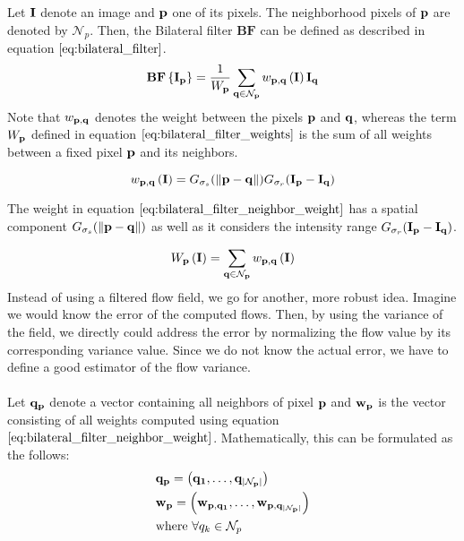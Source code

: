 Let $\bf{I}$ denote an image and $\bf{p}$ one of its pixels. The neighborhood pixels of $\bf{p}$ are denoted by $\mathcal{N}_p$. Then, the Bilateral filter $\textbf{BF}$ can be defined as described in equation $\ref{eq:bilateral_filter}$.
\begin{equation}
	\textbf{BF} \left\{ \bf{I}_{\bf{p}} \right\} = \frac{1}{W_{\bf{p}}} \sum_{\bf{q} \in \mathcal{N}_p} w_{\bf{p}, \bf{q}} \left( \bf{I} \right) \bf{I}_{\bf{q}}
\label{eq:bilateral_filter}
\end{equation}
Note that $w_{\bf{p}, \bf{q}}$ denotes the weight between the pixels $\bf{p}$ and $\bf{q}$, whereas the term $W_{\bf{p}}$ defined in equation $\ref{eq:bilateral_filter_weights}$ is the sum of all weights between a fixed pixel $\bf{p}$ and its neighbors.

\begin{equation}
	w_{\bf{p}, \bf{q}} \left( \bf{I} \right) = G_{\sigma_s} (\left\lVert\bf{p} - \bf{q}\right\rVert) G_{\sigma_r} (\bf{I}_{\bf{p}} - \bf{I}_{\bf{q}}) 
\label{eq:bilateral_filter_neighbor_weight}
\end{equation}

The weight in equation $\ref{eq:bilateral_filter_neighbor_weight}$ has a spatial component $G_{\sigma_s} (\left\lVert\bf{p} - \bf{q}\right\rVert)$ as well as it considers the intensity range $G_{\sigma_r} (\bf{I}_{\bf{p}} - \bf{I}_{\bf{q}})$.

\begin{equation}
	W_{\bf{p}} \left( \bf{I} \right) = \sum_{\bf{q} \in \mathcal{N}_p} w_{\bf{p}, \bf{q}} \left( \bf{I} \right)
\label{eq:bilateral_filter_weights}
\end{equation}
Instead of using a filtered flow field, we go for another, more robust idea. Imagine we would know the error of the computed flows. Then, by using the variance of the field, we directly could address the error by normalizing the flow value by its corresponding variance value. Since we do not know the actual error, we have to define a good estimator of the flow variance. \\ \\
Let $\bf{q}_p$ denote a vector containing all neighbors of pixel $\bf{p}$ and $\bf{w}_p$ is the vector consisting of all weights computed using equation $\ref{eq:bilateral_filter_neighbor_weight}$. Mathematically, this can be formulated as the follows:
\begin{equation}
\begin{aligned}
& \bf{q_p} = \left( q_1, \dots, q_{|\mathcal{N}_p|} \right) \\
& \bf{w_p} = \left( w_{p, q_1}, \dots, w_{p, q_{|\mathcal{N}_p|}} \right) \\
& \text{where } \forall q_k \in \mathcal{N}_p
\end{aligned}
\label{eq:bilat_weight_components}
\end{equation}

